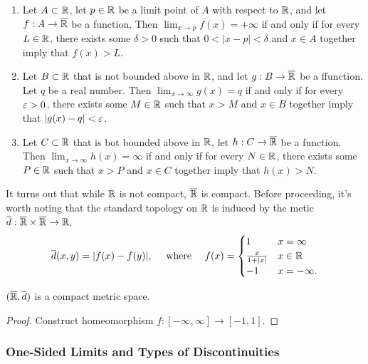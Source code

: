 \documentclass[12pt]{article} %
\begin{document}
\begin{proposition}
    \begin{enumerate}
        \item Let $A \subset \mathbb{R}$, let $p \in \mathbb{R}$ be a limit point of $A$ with respect to $\mathbb{R}$, and let $f : A \to \overline{\mathbb{R}}$ be a function. Then $\lim_{x \to p} f(x) = +\infty$ if and only if for every $L \in \mathbb{R}$, there exists some $\delta > 0$ such that $0 < |x-p| < \delta$ and $x \in A$ together imply that $f(x) > L$.
        \item Let $B \subset \mathbb{R}$ that is not bounded above in $\mathbb{R}$, and let $g : B \to \overline{\mathbb{R}}$ be a ffunction. Let $q$ be a real number. Then $\lim_{x \to \infty} g(x) = q$ if and only if for every $\varepsilon > 0$, there exists some $M \in \mathbb{R}$ such that $x > M$ and $x \in B$ together imply that $|g(x) - q| < \varepsilon$.
        \item Let $C \subset \mathbb{R}$ that is bot bounded above in $\mathbb{R}$, let $h : C \to \overline{\mathbb{R}}$ be a function. Then $\lim_{x \to \infty} h(x) = \infty$ if and only if for every $N \in \mathbb{R}$, there exists some $P \in \mathbb{R}$ such that $x > P$ and $x \in C$ together imply that $h(x) > N$.
    \end{enumerate}
\end{proposition}

It turns out that while $\mathbb{R}$ is not compact, $\overline{\mathbb{R}}$ is compact. Before proceeding, it's worth noting that the standard topology on $\mathbb{R}$ is induced by the metic $\overline{d} : \overline{\mathbb{R}} \times \overline{\mathbb{R}} \to \mathbb{R}$.\[\ol{d}(x, y) = |f(x) - f(y)|, \ \ \ \ \text{where} \ \ \ \ f(x) = \begin{cases}
    1 &x = \infty\\
    \frac{x}{1+|x|} &x \in \R\\
    -1 &x = -\infty.
\end{cases}\]

\begin{proposition}
    $(\overline{\mathbb{R}}, \overline{d})$ is a compact metric space.
\end{proposition}

\begin{proof}
    Construct homeomorphism $f : [-\infty, \infty] \to [-1,1]$.
\end{proof}

\subsubsection{One-Sided Limits and Types of Discontinuities}
\end{document}
